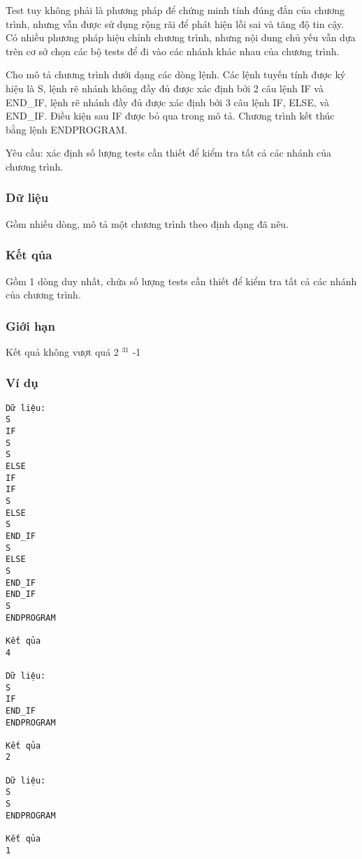 



   Test tuy không phải là phương pháp để chứng minh tính đúng đắn của chương trình, nhưng vẫn được sử dụng rộng rãi để phát hiện lỗi sai và tăng độ tin cậy. Có nhiều phương pháp hiệu chỉnh chương trình, nhưng nội dung chủ yếu vẫn dựa trên cơ sở chọn các bộ tests để đi vào các nhánh khác nhau của chương trình.  

   Cho mô tả chương trình dưới dạng các dòng lệnh. Các lệnh tuyến tính được ký hiệu là S, lệnh rẽ nhánh không đầy đủ được xác định bởi 2 câu lệnh IF và END\_IF, lệnh rẽ nhánh đầy đủ được xác định bởi 3 câu lệnh IF, ELSE, và END\_IF. Điều kiện sau IF được bỏ qua trong mô tả. Chương trình kết thúc bằng lệnh ENDPROGRAM.  

   Yêu cầu: xác định số lượng tests cần thiết để kiểm tra tất cả các nhánh của chương trình.  

\subsubsection{   Dữ liệu  }

   Gồm nhiều dòng, mô tả một chương trình theo định dạng đã nêu.  

\subsubsection{   Kết qủa  }

   Gồm 1 dòng duy nhất, chứa số lượng tests cần thiết để kiểm tra tất cả các nhánh của chương trình.  

\subsubsection{   Giới hạn  }

   Kết quả không vượt quá 2   $^    31   $   -1  

\subsubsection{   Ví dụ  }
\begin{verbatim}
Dữ liệu:
S
IF
S
S
ELSE
IF
IF
S
ELSE
S
END_IF
S
ELSE
S
END_IF
END_IF
S
ENDPROGRAM

Kết qủa
4

Dữ liệu:
S
IF
END_IF
ENDPROGRAM

Kết qủa
2

Dữ liệu:
S
S
ENDPROGRAM

Kết qủa
1
\end{verbatim}